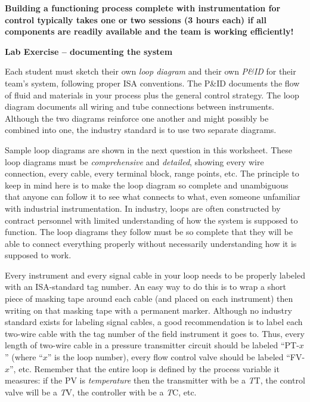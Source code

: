 \documentclass[12pt,a4paper]{article}
\begin{document}
\vskip 10pt

{\bf Building a functioning process complete with instrumentation for control typically takes one or two sessions (3 hours each) if all components are readily available and the team is working efficiently!}





\vfil \eject

\noindent
{\bf Lab Exercise -- documenting the system}

\vskip 5pt

Each student must sketch their own {\it loop diagram} and their own {\it P\&ID} for their team's system, following proper ISA conventions.  The P\&ID documents the flow of fluid and materials in your process plus the general control strategy.  The loop diagram documents all wiring and tube connections between instruments.  Although the two diagrams reinforce one another and might possibly be combined into one, the industry standard is to use two separate diagrams.

Sample loop diagrams are shown in the next question in this worksheet.  These loop diagrams must be {\it comprehensive} and {\it detailed}, showing every wire connection, every cable, every terminal block, range points, etc.  The principle to keep in mind here is to make the loop diagram so complete and unambiguous that anyone can follow it to see what connects to what, even someone unfamiliar with industrial instrumentation.  In industry, loops are often constructed by contract personnel with limited understanding of how the system is supposed to function.  The loop diagrams they follow must be so complete that they will be able to connect everything properly without necessarily understanding how it is supposed to work.

Every instrument and every signal cable in your loop needs to be properly labeled with an ISA-standard tag number.  An easy way to do this is to wrap a short piece of masking tape around each cable (and placed on each instrument) then writing on that masking tape with a permanent marker.  Although no industry standard exists for labeling signal cables, a good recommendation is to label each two-wire cable with the tag number of the field instrument it goes to.  Thus, every length of two-wire cable in a pressure transmitter circuit should be labeled ``PT-$x$'' (where ``$x$'' is the loop number), every flow control valve should be labeled ``FV-$x$'', etc.  Remember that the entire loop is defined by the process variable it measures: if the PV is {\it temperature} then the transmitter with be a {\it T}T, the control valve will be a {\it T}V, the controller with be a {\it T}C, etc.
\end{document}
